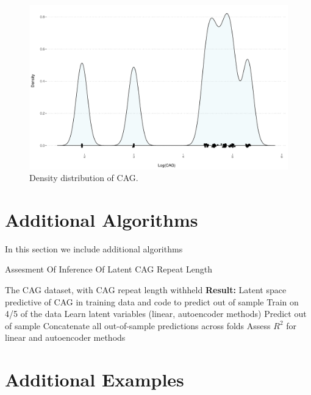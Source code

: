 \documentclass[letterpaper]{article}
\begin{document}
\begin{figure}[ht!]
  \centering
  \includegraphics[width=\linewidth]{./images/cagPlots.pdf}
      \caption{\label{fig_cag_density} Density distribution of CAG. }
\end{figure}

\clearpage
\section{Additional Algorithms}
In this section we include additional algorithms

\begin{algorithm}%
 \caption{Assesment Of Inference Of Latent CAG Repeat Length}
 \label{alg_cag}
\begin{algorithmic}
 The CAG dataset, with CAG repeat length withheld
\State \textbf{Result:} Latent space predictive of CAG in training data and code to predict out of sample
  \State Train on 4/5 of the data
  \State Learn latent variables (linear, autoencoder methods)
  \State Predict out of sample
 \EndFor
 \State Concatenate all out-of-sample predictions across folds
 \State Assess $R^{2}$ for linear and autoencoder methods
\end{algorithmic}
\end{algorithm}

\section{Additional Examples}
\small

\end{document}
